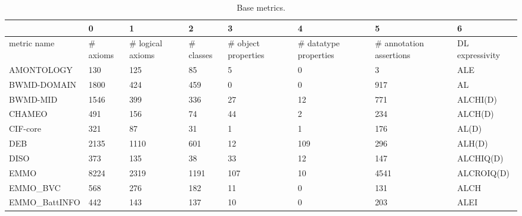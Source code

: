 \begin{table}
\centering
\caption{Base metrics.}
\label{tab:base-metrics}
\begin{tabular}{m{3.5cm}m{1cm}m{1cm}m{1cm}m{1cm}m{1cm}m{1cm}m{1cm}}
\toprule
{} &         0 &                 1 &          2 &                    3 &                      4 &                        5 &                6 \\
\midrule
metric name             &  \# axioms &  \# logical axioms &  \# classes &  \# object properties &  \# datatype properties &  \# annotation assertions &  DL expressivity \\
AMONTOLOGY              &       130 &               125 &         85 &                    5 &                      0 &                        3 &              ALE \\
BWMD-DOMAIN             &      1800 &               424 &        459 &                    0 &                      0 &                      917 &               AL \\
BWMD-MID                &      1546 &               399 &        336 &                   27 &                     12 &                      771 &         ALCHI(D) \\
CHAMEO                  &       491 &               156 &         74 &                   44 &                      2 &                      234 &          ALCH(D) \\
CIF-core                &       321 &                87 &         31 &                    1 &                      1 &                      176 &            AL(D) \\
DEB                     &      2135 &              1110 &        601 &                   12 &                    109 &                      296 &           ALH(D) \\
DISO                    &       373 &               135 &         38 &                   33 &                     12 &                      147 &        ALCHIQ(D) \\
EMMO                    &      8224 &              2319 &       1191 &                  107 &                     10 &                     4541 &       ALCROIQ(D) \\
EMMO\_BVC                &       568 &               276 &        182 &                   11 &                      0 &                      131 &             ALCH \\
EMMO\_BattINFO           &       442 &               143 &        137 &                   10 &                      0 &                      203 &             ALEI \\

\end{tabular}
\end{table}
